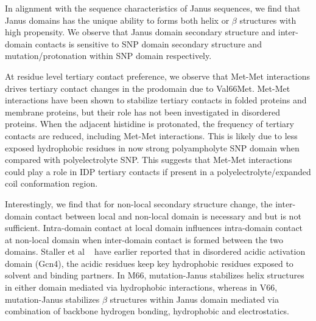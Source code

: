 \documentclass[journal=jacsat,manuscript=article]{achemso}
\begin{document}
In alignment with the sequence characteristics of Janus sequences, we find that Janus domains has the unique ability to forms both helix or $\beta$ structures with high propensity. We observe that Janus domain secondary structure and inter-domain contacts is sensitive to SNP domain secondary structure and mutation/protonation within SNP domain respectively. 


At residue level tertiary contact preference, we observe that Met-Met interactions drives tertiary contact changes in the prodomain due to Val66Met. Met-Met interactions have been shown to stabilize tertiary contacts in folded proteins and membrane proteins, but their role has not been investigated in disordered proteins. When the adjacent histidine is protonated, the frequency of tertiary contacts are reduced, including Met-Met interactions. This is likely due to less exposed hydrophobic residues in now strong polyampholyte SNP domain when compared with polyelectrolyte SNP. This suggests that Met-Met interactions could play a role in IDP tertiary contacts if present in a polyelectrolyte/expanded coil conformation region.

Interestingly, we find that for non-local secondary structure change, the inter-domain contact between local and non-local domain is necessary and but is not sufficient. Intra-domain contact at local domain influences intra-domain contact at non-local domain when inter-domain contact is formed between the two domains. Staller et al ~\cite {Staller2018} have earlier reported that in disordered acidic activation domain (Gcn4), the acidic residues keep key hydrophobic residues exposed to solvent and binding partners. In M66, mutation-Janus stabilizes helix structures in either domain mediated via hydrophobic interactions, whereas in V66, mutation-Janus stabilizes $\beta$ structures within Janus domain mediated via combination of backbone hydrogen bonding, hydrophobic and electrostatics.

\end{document}
